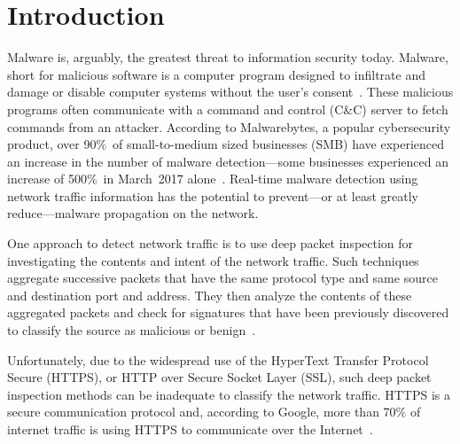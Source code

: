 \chapter{Introduction\label{chap:intro}}

Malware is, arguably, the greatest threat to information security today. Malware, short for malicious software is a computer program designed to infiltrate and damage or disable computer systems without the user's consent~\cite{Aycock06}. These malicious programs often communicate with a command and control (C\&C) server to fetch commands from an attacker. According to Malwarebytes, a popular cybersecurity product, over 90\%\ of small-to-medium sized businesses (SMB) have experienced an increase in the number of malware detection---some businesses experienced an increase of 500\%\  in March~2017 alone~\cite{Malwarebytes17}. Real-time malware detection using network traffic information has the potential to prevent---or at least greatly reduce---malware propagation on the network.

One approach to detect network traffic is to use deep packet inspection for investigating the contents and intent of the network traffic. Such techniques aggregate successive packets that have the same protocol type and same source and destination port and address. They then analyze the contents of these aggregated packets and check for signatures that have been previously discovered to classify the source as malicious or benign~\cite{SenSW04}.

Unfortunately, due to the widespread use of the HyperText Transfer Protocol Secure (HTTPS), or HTTP over Secure Socket Layer (SSL), such deep packet inspection methods can be inadequate to classify the network traffic. HTTPS is a secure communication protocol and, according to Google, more than 70\% of internet traffic is using HTTPS to communicate over the Internet~\cite{Google17}. 

